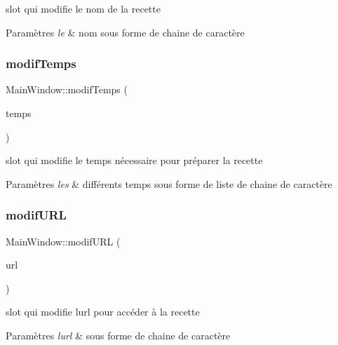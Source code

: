 slot qui modifie le nom de la recette 


\begin{DoxyParams}{Paramètres}
{\em le} & nom sous forme de chaine de caractère \\
\hline
\end{DoxyParams}
\mbox{\label{classMainWindow_ab49cf9603a1a539ca19623eac88b86c2}} 
\subsubsection{\texorpdfstring{modif\+Temps}{modifTemps}}
{\footnotesize\ttfamily Main\+Window\+::modif\+Temps (\begin{DoxyParamCaption}\item[{Q\+String}]{temps }\end{DoxyParamCaption})\hspace{0.3cm}{\ttfamily [slot]}}



slot qui modifie le temps nécessaire pour préparer la recette 


\begin{DoxyParams}{Paramètres}
{\em les} & différents temps sous forme de liste de chaine de caractère \\
\hline
\end{DoxyParams}
\mbox{\label{classMainWindow_a3620273f0e53b380d70df636400e8519}} 
\subsubsection{\texorpdfstring{modif\+U\+RL}{modifURL}}
{\footnotesize\ttfamily Main\+Window\+::modif\+U\+RL (\begin{DoxyParamCaption}\item[{Q\+String}]{url }\end{DoxyParamCaption})\hspace{0.3cm}{\ttfamily [slot]}}



slot qui modifie l\textquotesingle{}url pour accéder à la recette 


\begin{DoxyParams}{Paramètres}
{\em l\textquotesingle{}url} & sous forme de chaine de caractère \\
\hline
\end{DoxyParams}
\mbox{\label{classMainWindow_a0b79b7ea071fc3a4baa45f8394052ffd}} 
